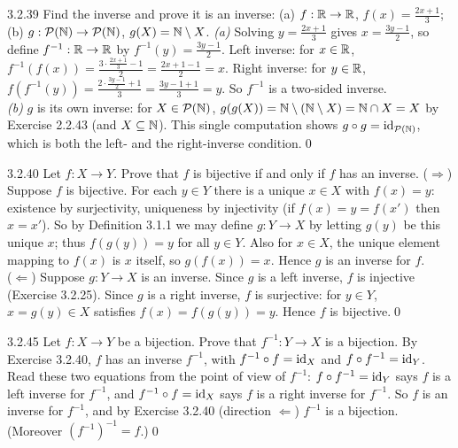 \begin{bookex}[recommended (a), (b)]{3.2.39}
Find the inverse and prove it is an inverse: (a) $f:\mathbb{R}\to\mathbb{R}$, $f(x)=\frac{2x+1}3$; (b) $g:\mathcal{P}(\mathbb{N})\to\mathcal{P}(\mathbb{N})$, $g(X)=\mathbb{N}\setminus X$.
\solution
\emph{(a)} Solving $y=\frac{2x+1}3$ gives $x=\frac{3y-1}2$, so define $f^{-1}:\mathbb{R}\to\mathbb{R}$ by $f^{-1}(y)=\frac{3y-1}2$. Left inverse: for $x\in\mathbb{R}$, $f^{-1}(f(x))=\frac{3\cdot\frac{2x+1}3-1}2=\frac{2x+1-1}2=x$. Right inverse: for $y\in\mathbb{R}$, $f(f^{-1}(y))=\frac{2\cdot\frac{3y-1}2+1}3=\frac{3y-1+1}3=y$. So $f^{-1}$ is a two-sided inverse.\\
\emph{(b)} $g$ is its own inverse: for $X\in\mathcal{P}(\mathbb{N})$, $g(g(X))=\mathbb{N}\setminus(\mathbb{N}\setminus X)=\mathbb{N}\cap X=X$ by Exercise 2.2.43 (and $X\subseteq\mathbb{N}$). This single computation shows $g\circ g=\mathrm{id}_{\mathcal{P}(\mathbb{N})}$, which is both the left- and the right-inverse condition.\qed
\end{bookex}

\begin{bookex}[essential]{3.2.40}
Let $f:X\to Y$. Prove that $f$ is bijective if and only if $f$ has an inverse.
\solution
($\Rightarrow$) Suppose $f$ is bijective. For each $y\in Y$ there is a unique $x\in X$ with $f(x)=y$: existence by surjectivity, uniqueness by injectivity (if $f(x)=y=f(x')$ then $x=x'$). So by Definition 3.1.1 we may define $g:Y\to X$ by letting $g(y)$ be this unique $x$; thus $f(g(y))=y$ for all $y\in Y$. Also for $x\in X$, the unique element mapping to $f(x)$ is $x$ itself, so $g(f(x))=x$. Hence $g$ is an inverse for $f$.\\
($\Leftarrow$) Suppose $g:Y\to X$ is an inverse. Since $g$ is a left inverse, $f$ is injective (Exercise 3.2.25). Since $g$ is a right inverse, $f$ is surjective: for $y\in Y$, $x=g(y)\in X$ satisfies $f(x)=f(g(y))=y$. Hence $f$ is bijective.\qed
\end{bookex}

\begin{bookex}[recommended]{3.2.45}
Let $f:X\to Y$ be a bijection. Prove that $f^{-1}:Y\to X$ is a bijection.
\solution
By Exercise 3.2.40, $f$ has an inverse $f^{-1}$, with $f^{-1}\circ f=\mathrm{id}_X$ and $f\circ f^{-1}=\mathrm{id}_Y$. Read these two equations from the point of view of $f^{-1}$: $f\circ f^{-1}=\mathrm{id}_Y$ says $f$ is a left inverse for $f^{-1}$, and $f^{-1}\circ f=\mathrm{id}_X$ says $f$ is a right inverse for $f^{-1}$. So $f$ is an inverse for $f^{-1}$, and by Exercise 3.2.40 (direction $\Leftarrow$) $f^{-1}$ is a bijection. (Moreover $(f^{-1})^{-1}=f$.)\qed
\end{bookex}

